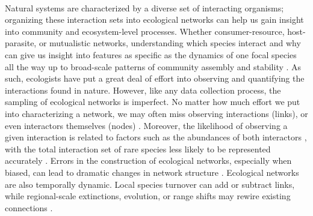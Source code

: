 \paragraph*{}
Natural systems are characterized by a diverse set of interacting organisms; organizing these interaction sets into ecological networks can help us gain insight into community and ecosystem-level processes. Whether consumer-resource, host-parasite, or mutualistic networks, understanding which species interact and why can give us insight into features as specific as the dynamics of one focal species all the way up to broad-scale patterns of community assembly and stability \cite{guimaraes2020structure, saravia2022ecological}. As such, ecologists have put a great deal of effort into observing and quantifying the interactions found in nature. However, like any data collection process, the sampling of ecological networks is imperfect. No matter how much effort we put into characterizing a network, we may often miss observing interactions (links), or even interactors themselves (nodes) \cite{Young21}. Moreover, the likelihood of observing a given interaction is related to factors such as the abundances of both interactors \cite{canard2014empirical}, with the total interaction set of rare species less likely to be represented accurately \cite{cirtwill2019quantitative, olesen2011missing}. Errors in the construction of ecological networks, especially when biased, can lead to dramatic changes in network structure \cite{bluthgen2008, Young21}. Ecological networks are also temporally dynamic. Local species turnover can add or subtract links, while regional-scale extinctions, evolution, or range shifts may rewire existing connections \cite{olesen2011}. 

